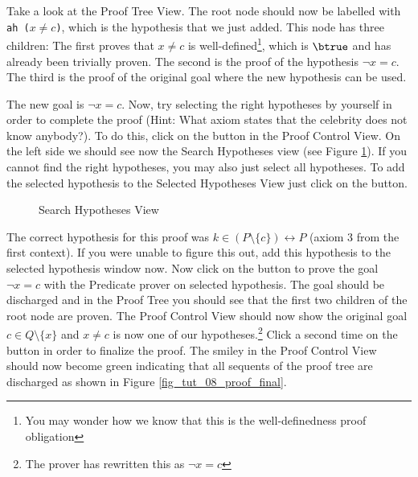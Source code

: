 
Take a look at the Proof Tree View. The root node should now be labelled with \texttt{ah ($x\neq c$)},
  which is the hypothesis that we just added.
This node has three children: The first proves that $x\neq c$ is well-defined\footnote{You may wonder how we know that this is the well-definedness proof obligation}, which is $\btrue$ and has already been trivially proven.
The second is the proof of the hypothesis $\lnot x=c$.
The third is the proof of the original goal where the new hypothesis can be used.

The new goal is $\lnot x = c$. Now, try selecting the right hypotheses by yourself in order to complete the proof (Hint: What axiom states that the celebrity does not know anybody?). To do this, click on the  button in the \textsf{Proof Control View}. On the left side we should see now the \textsf{Search Hypotheses} view (see Figure \ref{fig_tut_08_search_hypothesis}). If you cannot find the right hypotheses, you may also just select all hypotheses. To add the selected hypothesis to the \textsf{Selected Hypotheses View} just click on the  button. 


\begin{figure}[!ht]
\begin{center}
	\caption{Search Hypotheses View}
	\label{fig_tut_08_search_hypothesis}
\end{center}
\end{figure}

The correct hypothesis for this proof was $k \in  (P \setminus  \{ c\} ) \rel  P$ (axiom 3 from the first context). If you were unable to figure this out, add this hypothesis to the selected hypothesis window now. Now click on the  button to prove the goal $\lnot x = c$ with the \textsf{Predicate prover on selected hypothesis}. The goal should be discharged and in the Proof Tree you should see that the first two children of the root node are proven. The \textsf{Proof Control View} should now show the original goal $c \in Q \setminus \{x\}$ and $x\neq c$ is now one of our hypotheses.\footnote{The prover has rewritten this as $ \lnot x = c$} Click a second time on the  button in order to finalize the proof. The smiley in the \textsf{Proof Control View} should now become green indicating that all sequents of the proof tree are discharged as shown in Figure \ref{fig_tut_08_proof_final}.

